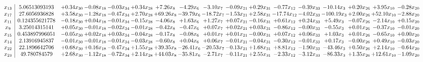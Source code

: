 \documentclass[9pt]{article}
\begin{document}
 \[\begin{array}{c| c c@{\hskip 2pt} c@{\hskip 2pt} c@{\hskip 2pt} c@{\hskip 2pt} c@{\hskip 2pt} c@{\hskip 2pt} c@{\hskip 2pt} c@{\hskip 2pt} c@{\hskip 2pt} c@{\hskip 2pt} c@{\hskip 2pt} c@{\hskip 2pt} c@{\hskip 2pt} c@{\hskip 2pt} c@{\hskip 2pt} }
 x_{13}   &  5.06513093193 & +  0.34 x_{30} & -0.08 x_{18} & -0.03 x_{34} & +  0.34 x_{28} & +  7.26 x_{8} & -4.29 x_{6} & -3.10 x_{7} & -0.09 x_{21} & +  0.29 x_{31} & -0.77 x_{12} & -0.39 x_{33} & -10.14 x_{3} & +  0.20 x_{26} & +  3.95 x_{10} & -0.28 x_{20}\\
 x_{17}   &  27.6056936828 & +  3.58 x_{30} & -1.28 x_{18} & -0.47 x_{34} & +  2.70 x_{28} & + 69.26 x_{8} & -39.79 x_{6} & -18.72 x_{7} & -1.53 x_{21} & +  2.58 x_{31} & -17.74 x_{12} & -4.02 x_{33} & -100.19 x_{3} & +  2.00 x_{26} & + 52.10 x_{10} & -2.88 x_{20}\\
 x_{11}   &  0.124355621778 & -0.18 x_{30} & +  0.04 x_{18} & -0.01 x_{34} & -0.15 x_{28} & -4.06 x_{8} & +  1.63 x_{6} & +  1.27 x_{7} & +  0.07 x_{21} & -0.16 x_{31} & +  0.61 x_{12} & +  0.24 x_{33} & +  5.49 x_{3} & -0.07 x_{26} & -2.14 x_{10} & +  0.15 x_{20}\\
 x_{9}   &  3.25014315141 & +  0.05 x_{30} & -0.01 x_{18} & -0.02 x_{34} & -0.01 x_{28} & -0.42 x_{8} & -0.47 x_{6} & +  0.07 x_{7} & +  0.02 x_{21} & +  0.03 x_{31} & -0.86 x_{12} & -0.00 x_{33} & -0.55 x_{3} & +  0.01 x_{26} & -0.37 x_{10} & -0.01 x_{20}\\
 x_{15}   &  0.453897996051 & -0.05 x_{30} & +  0.02 x_{18} & +  0.03 x_{34} & -0.04 x_{28} & -0.17 x_{8} & -0.08 x_{6} & +  0.01 x_{7} & +  0.01 x_{21} & -0.00 x_{31} & +  0.07 x_{12} & +  0.06 x_{33} & +  1.03 x_{3} & +  0.01 x_{26} & -0.65 x_{10} & +  0.00 x_{20}\\
 x_{14}   &  2.13916945837 & -0.01 x_{30} & -0.01 x_{18} & -0.01 x_{34} & -0.03 x_{28} & -0.60 x_{8} & +  0.04 x_{6} & +  0.06 x_{7} & -0.01 x_{21} & -0.04 x_{31} & -0.30 x_{12} & -0.01 x_{33} & +  0.17 x_{3} & -0.00 x_{26} & +  0.49 x_{10} & -0.03 x_{20}\\
 x_{22}   &  22.1896642706 & +  0.68 x_{30} & +  0.16 x_{18} & -0.47 x_{34} & +  1.55 x_{28} & + 39.35 x_{8} & -26.41 x_{6} & -20.53 x_{7} & -0.13 x_{21} & +  1.68 x_{31} & +  8.81 x_{12} & -1.90 x_{33} & -43.46 x_{3} & +  0.50 x_{26} & +  2.14 x_{10} & -0.64 x_{20}\\
 x_{23}   &  49.780784579 & +  2.68 x_{30} & -1.12 x_{18} & -0.72 x_{34} & +  2.14 x_{28} & + 44.03 x_{8} & -35.81 x_{6} & -2.71 x_{7} & -0.11 x_{21} & +  2.55 x_{31} & -2.33 x_{12} & -3.12 x_{33} & -86.33 x_{3} & +  1.35 x_{26} & + 12.61 x_{10} & -1.09 x_{20}\\

\end{array}\]
\end{document}
